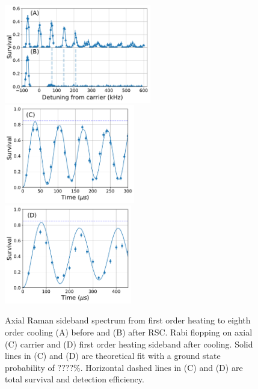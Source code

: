 \documentclass[aps,prl,twocolumn,groupedaddress]{revtex4-1}
\begin{document}
\begin{figure}
  \includegraphics[height=4.3cm]{imgs/spectrum_a1.pdf}
  \includegraphics[height=4.3cm]{imgs/rabi_flop_a1_0.pdf}
  \includegraphics[height=4.3cm]{imgs/rabi_flop_a1_p1.pdf}
  \caption{Axial Raman sideband spectrum from first order heating to eighth order cooling
    (A) before and (B) after RSC.
    Rabi flopping on axial (C) carrier and (D) first order heating sideband
    after cooling.
    Solid lines in (C) and (D) are theoretical fit with a ground state probability of $????\%$.
    Horizontal dashed lines in (C) and (D) are total survival and detection efficiency.
    \label{f-axial}}
\end{figure}
\end{document}
